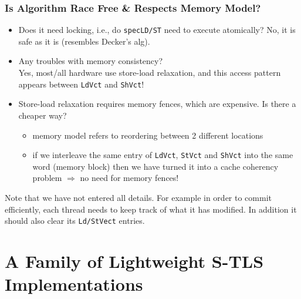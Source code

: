 \documentclass{beamer}
\newcommand{\emp}[1]{\textcolor{DikuRed}{ #1}}
\newcommand{\emphh}[1]{\textcolor{CosGreen}{ #1}}
\begin{document}
\begin{frame}[fragile,t]
  \frametitle{Is Algorithm Race Free \& Respects Memory Model?}

\begin{itemize}
\item \emp{Does it need locking}, i.e., do {\tt specLD/ST} need to execute atomically?\pause
        \emphh{No, it is safe as it is (resembles Decker's alg).}\medskip

\item \emp{Any troubles with memory consistency?}\pause\\
    \alert{Yes}, most/all hardware use store-load relaxation, and this
        access pattern appears between \alert{{\tt LdVct} and {\tt ShVct}}!\medskip

\item Store-load relaxation requires memory fences, which are expensive.
        \alert{Is there a cheaper way?}\pause\medskip
\begin{itemize}
    \item memory model refers to reordering between 2 different locations
    \item if we interleave the same entry of {\tt LdVct}, {\tt StVct}
            and {\tt ShVct} into the same word (memory block) then
            we have turned it into a cache coherency problem $\Rightarrow$
            no need for memory fences! 
\end{itemize}
\end{itemize}\bigskip

Note that we have not entered all details. For example in order to commit
efficiently, each thread needs to keep track of what it has modified.
In addition it should also clear its {\tt Ld/StVect} entries.

\end{frame}


\section{A Family of Lightweight S-TLS Implementations}

\begin{frame}[fragile]
	\tableofcontents[currentsection]
\end{frame}
\end{document}
